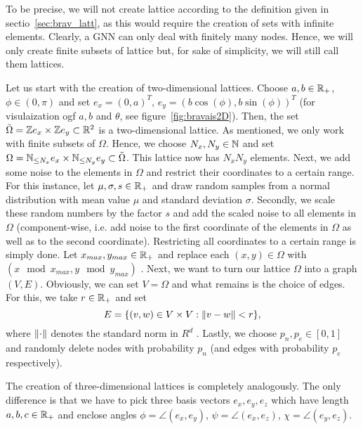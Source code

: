 \label{sec:creationLattice}

To be precise, we will not create lattice according to the definition given in sectio~\ref{sec:brav_latt}, 
as this would require the creation of sets with infinite elements. Clearly, a GNN can only deal with finitely many nodes.
Hence, we will only create finite subsets of lattice but, for sake of simplicity, we will still call them lattices.

Let us start with the creation of two-dimensional lattices.
Choose $a,b\in\mathbb{R}_+$, $\phi\in(0,\pi)$ and set
$e_x=(0,a)^T,\,e_y=(b\cos(\phi), b\sin(\phi))^T$ (for visulaization ogf $a,b$ and $\theta$, see figure~\ref{fig:bravais2D}). 
Then, the set $\tilde{\Omega}=\mathbb{Z} e_x\times\mathbb{Z} e_y\subset\mathbb{R}^2$ is a two-dimensional lattice.
As mentioned, we only work with finite subsets of $\Omega$. Hence, we choose $N_x,N_y\in\mathbb{N}$ and set $\Omega=\mathbb{N}_{\leq N_x}e_x\times\mathbb{N}_{\leq N_y}e_y\subset\tilde{\Omega}$.
This lattice now has $N_xN_y$ elements.
Next, we add some noise to the elements in $\Omega$ and restrict their coordinates to a certain range. For this instance, let $\mu,\sigma,s\in\mathbb{R}_+$ and draw random samples from
a normal distribution with mean value $\mu$ and standard deviation $\sigma$. Secondly, we scale these random numbers by the factor $s$ 
and add the scaled noise to all elements in $\Omega$ (component-wise, i.e. add noise to the first coordinate of the elements in $\Omega$ as well as to the second coordinate).
Restricting all coordinates to a certain range is simply done. Let $x_{max}, y_{max}\in\mathbb{R}_+$ and replace each $(x,y)\in\Omega$ with $(x \mod x_{max}, y \mod y_{max})$ 
.
Next, we want to turn our lattice $\Omega$ into a graph $(V,E)$. Obviously, we can set $V=\Omega$ and what remains is the choice of edges. For this, we take $r\in\mathbb{R}_+$ and set
\begin{equation*}
    E=\{(v, w)\in V\times V: \lVert v-w\rVert<r\},
\end{equation*}
where $\lVert\cdot\rVert$ denotes the standard norm in $R^d$ .
Lastly, we choose $p_n,p_e\in[0,1]$ and randomly delete nodes with probability $p_n$ (and edges with probability $p_e$ respectively).

The creation of three-dimensional lattices is completely analogously. The only difference is that we have to pick three basis vectors $e_x,e_y,e_z$ which have length $a,b,c\in\mathbb{R}_+$ and 
enclose angles $\phi=\angle(e_x, e_y),\,\psi=\angle(e_x,e_z),\,\chi=\angle(e_y,e_z)$. 

